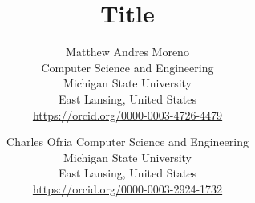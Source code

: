 \title{Title}

\author{
Matthew Andres Moreno\\
Computer Science and Engineering \\
Michigan State University\\
East Lansing, United States \\
\url{https://orcid.org/0000-0003-4726-4479} \\
\and
Charles Ofria
Computer Science and Engineering \\
Michigan State University\\
East Lansing, United States \\
\url{https://orcid.org/0000-0003-2924-1732}
}

\maketitle
